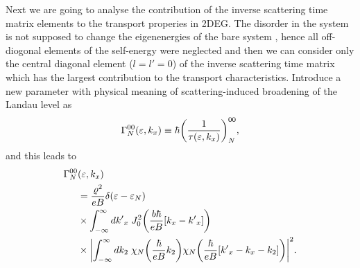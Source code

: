 Next we are going to analyse the contribution of the inverse scattering time matrix elements to the transport properies in 2DEG. The disorder in the system is not supposed to change the eigenenergies of the bare system \cite{wackerl20}, hence all off-diogonal elements of the self-energy were neglected and then we can consider only the central diagonal element (${l=l'=0}$) of the inverse scattering time matrix which has the largest contribution to the transport characteristics.
Introduce a new parameter with physical meaning of scattering-induced broadening of the Landau level as \cite{dini16,endo09}
\begin{equation} \label{eq_14}
 \Gamma^{00}_{N}(\varepsilon,k_x) \equiv \hbar \qty(\frac{1}{\tau(\varepsilon,k_x)})^{00}_{N},
\end{equation}
and this leads to
\begin{equation} \label{eq_15}
 \begin{aligned}
   \Gamma^{00}_{N}& (\varepsilon,k_x) \\
   & =
   \frac { \varrho^2}{eB}
   \delta(\varepsilon - \varepsilon_{N}) \\
   & \times
   \int_{-\infty}^{\infty} d {k'}_x \;
   J_0^2\qty(\frac{b\hbar}{eB}[{k}_x - {k'}_x])
   \\
   & \times
   \qty|
   \int_{-\infty}^{\infty} dk_2 \;
   {\chi}_{N}\qty(\frac{\hbar}{eB}k_2)
   {\chi}_{N}\qty(\frac{\hbar}{eB} \qty[{k'}_x - {k}_x - k_2])|^2.
 \end{aligned}
\end{equation}

